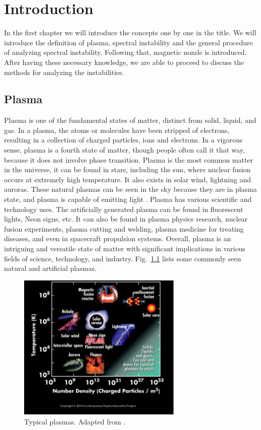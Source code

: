 \chapter{Introduction}
In the first chapter we will introduce the concepts one by one in the title. We will introduce the definition of plasma, spectral instability and the general procedure of analyzing spectral instability. Following that, magnetic nozzle is introduced. After having these necessary knowledge, we are able to proceed to discuss the methods for analyzing the instabilities.

\section{Plasma}
Plasma is one of the fundamental states of matter, distinct from solid, liquid, and gas. In a plasma, the atoms or molecules have been stripped of electrons, resulting in a collection of charged particles, ions and electrons. In a vigorous sense, plasma is a fourth state of matter, though people often call it that way, because it does not involve phase transition. Plasma is the most common matter in the universe, it can be found in stars, including the sun, where nuclear fusion occurs at extremely high temperature. It also exists in solar wind, lightning and auroras. These natural plasmas can be seen in the sky because they are in plasma state, and plasma is capable of emitting light \cite{chen_introduction_2016}. Plasma has various scientific and technology uses. The artificially generated plasma can be found in fluorescent lights, Neon signs, etc. It can also be found in plasma physics research, nuclear fusion experiments, plasma cutting and welding, plasma medicine for treating diseases, and even in spacecraft propulsion systems. Overall, plasma is an intriguing and versatile state of matter with significant implications in various fields of science, technology, and industry. Fig.~\ref{fig:plasma-properties} lists some commonly seen natural and artificial plasmas.

\begin{figure}[htbp]
	\centering
	\includegraphics[width=0.7\textwidth]{figures/plasma-properties}
	\caption{Typical plasmas. Adapted from \cite{cpep_physics}.}
	\label{fig:plasma-properties}
\end{figure}

